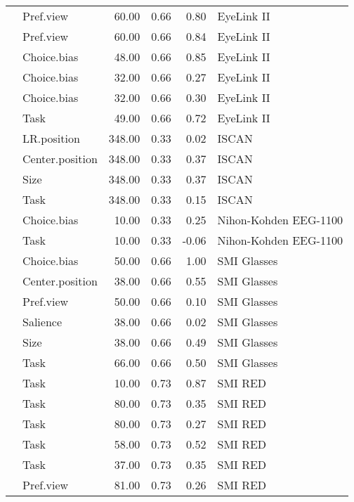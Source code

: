 \begin{longtable}{llrrrl}
  \cite{meissner2016a} & Pref.view & 60.00 & 0.66 & 0.80 & EyeLink II \\ 
  \cite{meissner2016a} & Pref.view & 60.00 & 0.66 & 0.84 & EyeLink II \\ 
  \cite{mitsuda2014} & Choice.bias & 48.00 & 0.66 & 0.85 & EyeLink II \\ 
  \cite{schotter2010a} & Choice.bias & 32.00 & 0.66 & 0.27 & EyeLink II \\ 
  \cite{schotter2010a} & Choice.bias & 32.00 & 0.66 & 0.30 & EyeLink II \\ 
  \cite{su2013} & Task & 49.00 & 0.66 & 0.72 & EyeLink II \\ 
  \cite{chandon2009a} & LR.position & 348.00 & 0.33 & 0.02 & ISCAN \\ 
  \cite{chandon2009a} & Center.position & 348.00 & 0.33 & 0.37 & ISCAN \\ 
  \cite{chandon2009a} & Size & 348.00 & 0.33 & 0.37 & ISCAN \\ 
  \cite{chandon2009a} & Task & 348.00 & 0.33 & 0.15 & ISCAN \\ 
  \cite{nittono2009} & Choice.bias & 10.00 & 0.33 & 0.25 & Nihon-Kohden EEG-1100 \\ 
  \cite{nittono2009} & Task & 10.00 & 0.33 & -0.06 & Nihon-Kohden EEG-1100 \\ 
  \cite{gidlof2017a} & Choice.bias & 50.00 & 0.66 & 1.00 & SMI Glasses \\ 
  \cite{gidlof2017a} & Center.position & 38.00 & 0.66 & 0.55 & SMI Glasses \\ 
  \cite{gidlof2017a} & Pref.view & 50.00 & 0.66 & 0.10 & SMI Glasses \\ 
  \cite{gidlof2017a} & Salience & 38.00 & 0.66 & 0.02 & SMI Glasses \\ 
  \cite{gidlof2017a} & Size & 38.00 & 0.66 & 0.49 & SMI Glasses \\ 
  \cite{guyader2017} & Task & 66.00 & 0.66 & 0.50 & SMI Glasses \\ 
  \cite{bialkova2011} & Task & 10.00 & 0.73 & 0.87 & SMI RED \\ 
  \cite{bialkova2014a} & Task & 80.00 & 0.73 & 0.35 & SMI RED \\ 
  \cite{bialkova2014a} & Task & 80.00 & 0.73 & 0.27 & SMI RED \\ 
  \cite{paernamets2015a} & Task & 58.00 & 0.73 & 0.52 & SMI RED \\ 
  \cite{paernamets2015a} & Task & 37.00 & 0.73 & 0.35 & SMI RED \\ 
  \cite{vanloo2015} & Pref.view & 81.00 & 0.73 & 0.26 & SMI RED \\ 

\end{longtable}
